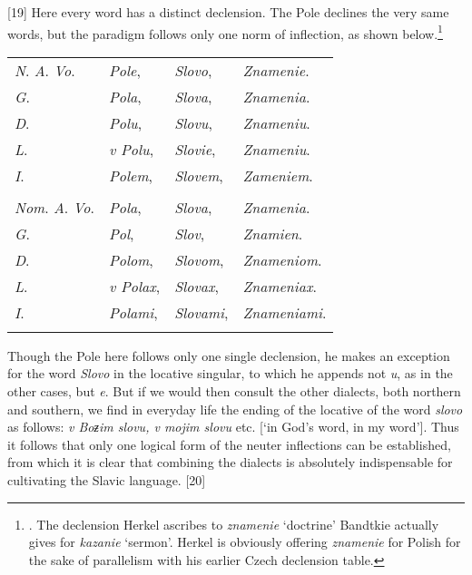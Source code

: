 [19] Here every word has a distinct declension. The Pole declines the very same words, but the paradigm follows only one norm of inflection, as shown below.\footnote{\citet[122--123]{bandtkie_polnische_1808}. The declension Herkel ascribes to \textit{znamenie} ‘doctrine’ Bandtkie actually gives for \textit{kazanie} ‘sermon’. Herkel is obviously offering \textit{znamenie} for Polish for the sake of parallelism with his earlier Czech declension table.}

\begin{longtable}{ l l l l }
    \lsptoprule
    \multicolumn{4}{ c }{Singular.} \\
    \midrule
    \textit{N}. \textit{A}. \textit{Vo}. & \textit{Pole}, & \textit{Slovo}, & \textit{Znamenie}. \\
    \textit{G}. & \textit{Pola}, & \textit{Slova}, & \textit{Znamenia}. \\
    \textit{D}. & \textit{Polu}, & \textit{Slovu}, & \textit{Znameniu}. \\
    \textit{L}. & \textit{v Polu}, & \textit{Slovie}, & \textit{Znameniu}. \\
    \textit{I}. & \textit{Polem}, & \textit{Slovem}, & \textit{Zameniem}. \\
    \lspbottomrule
    \newpage
    \lsptoprule
    \multicolumn{4}{ c }{Plural.} \\
    \midrule
    \textit{Nom}. \textit{A}. \textit{Vo}. & \textit{Pola}, & \textit{Slova}, & \textit{Znamenia}. \\
    \textit{G}. & \textit{Pol}, & \textit{Slov}, & \textit{Znamien}. \\
    \textit{D}. & \textit{Polom}, & \textit{Slovom}, & \textit{Znameniom}. \\
    \textit{L}. & \textit{v Polax}, & \textit{Slovax}, & \textit{Znameniax}. \\
    \textit{I}. & \textit{Polami}, & \textit{Slovami}, & \textit{Znameniami}. \\
    \lspbottomrule
\end{longtable}

Though the Pole here follows only one single declension, he makes an exception for the word \textit{Slovo} in the locative singular, to which he appends not \textit{u}, as in the other cases, but \textit{e}. But if we would then consult the other dialects, both northern and southern, we find in everyday life the ending of the locative of the word \textit{slovo} as follows: \textit{v Boƶim slovu, v mojim slovu} etc. [‘in God’s word, in my word’]. Thus it follows that only one logical form of the neuter inflections can be established, from which it is clear that combining the dialects is absolutely indispensable for cultivating the Slavic language. [20]

